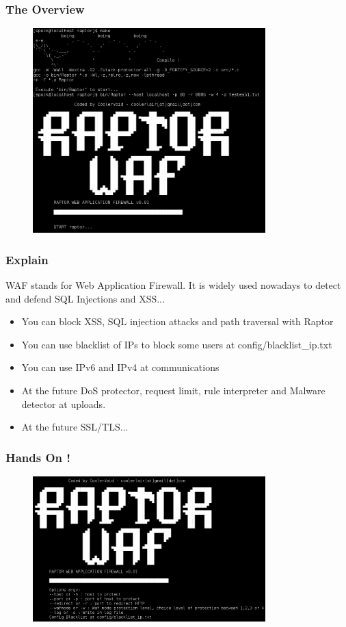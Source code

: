 \documentclass[serif,mathserif]{beamer}
\begin{document}
\begin{frame}
  \frametitle{The Overview}
  \begin{figure}[]    
    \centering
    \includegraphics[width=9cm]{images/raptormenu.png} 
  \end{figure}
\end{frame}


\begin{frame}
  \frametitle{Explain}
  WAF stands for Web Application Firewall. It is widely used nowadays to detect and defend SQL Injections and XSS...
  \begin{itemize}
  \item You can block XSS, SQL injection attacks and path traversal with Raptor
  \item You can use blacklist of IPs to block some users at config/blacklist\_ip.txt
  \item You can use IPv6 and IPv4 at communications
  \item At the future DoS protector, request limit, rule interpreter and Malware detector at uploads.
  \item At the future SSL/TLS...
  \end{itemize}
\end{frame}

\begin{frame}
  \frametitle{Hands On !}
  \begin{itemize}
  \begin{figure}[]    
    \centering
    \includegraphics[width=9cm]{images/help.png} 
  \end{figure}
  \end{itemize}
\end{frame}
\end{document}
